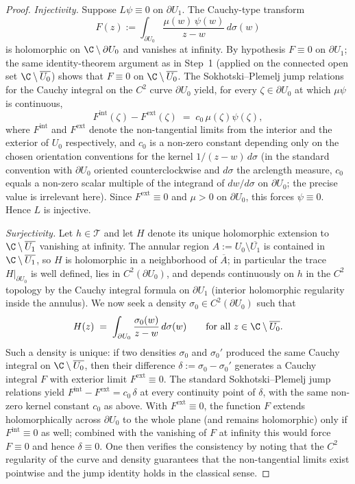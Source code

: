 \begin{proof}
\smallskip
\emph{Injectivity.} Suppose \(L\psi\equiv 0\) on \(\partial U_1\). The
Cauchy-type transform
\[
F(z):=\int_{\partial U_0}\frac{\mu(w)\,\psi(w)}{z-w}\,d\sigma(w)
\]
is holomorphic on \(\C\setminus \partial U_0\) and vanishes at infinity.
By hypothesis \(F\equiv 0\) on \(\partial U_1\); the same identity-theorem
argument as in Step~1 (applied on the connected open set
\(\C\setminus \overline{U_0}\)) shows that
\(F\equiv 0\) on \(\C\setminus \overline{U_0}\). The Sokhotski--Plemelj
jump relations for the Cauchy integral on the \(C^2\) curve
\(\partial U_0\) \cite[Ch.~III]{Garnett} yield, for every
\(\zeta\in \partial U_0\) at which \(\mu\psi\) is continuous,
\[
F^{\mathrm{int}}(\zeta)-F^{\mathrm{ext}}(\zeta)
\;=\;c_0\,\mu(\zeta)\psi(\zeta),
\]
where \(F^{\mathrm{int}}\) and \(F^{\mathrm{ext}}\) denote the
non-tangential limits from the interior and the exterior of \(U_0\)
respectively, and \(c_0\) is a non-zero constant depending only on the
chosen orientation conventions for the kernel \(1/(z-w)\,d\sigma\)
(in the standard convention with \(\partial U_0\) oriented counterclockwise
and \(d\sigma\) the arclength measure, \(c_0\) equals a non-zero scalar
multiple of the integrand of \(dw/d\sigma\) on \(\partial U_0\); the
precise value is irrelevant here). Since \(F^{\mathrm{ext}}\equiv 0\) and
\(\mu>0\) on \(\partial U_0\), this forces \(\psi\equiv 0\). Hence \(L\)
is injective.

\smallskip
\emph{Surjectivity.} Let \(h\in \mathcal{T}\) and let \(H\) denote its
unique holomorphic extension to \(\C\setminus \overline{U_1}\) vanishing at
infinity. The annular region \(A:=U_0\setminus \overline{U_1}\) is
contained in \(\C\setminus \overline{U_1}\), so \(H\) is holomorphic in a
neighborhood of \(\overline{A}\); in particular the trace
\(H|_{\partial U_0}\) is well defined, lies in \(C^2(\partial U_0)\), and
depends continuously on \(h\) in the \(C^2\) topology by the Cauchy integral
formula on \(\partial U_1\) (interior holomorphic regularity inside the
annulus). We now seek a density \(\sigma_0\in C^2(\partial U_0)\) such that
\[
H(z)\;=\;\int_{\partial U_0}\frac{\sigma_0(w)}{z-w}\,d\sigma(w)
\qquad \text{for all }z\in \C\setminus \overline{U_0}.
\]
Such a density is unique: if two densities \(\sigma_0\) and
\(\sigma_0'\) produced the same Cauchy integral on
\(\C\setminus \overline{U_0}\), then their difference \(\delta:=\sigma_0
-\sigma_0'\) generates a Cauchy integral \(F\) with exterior limit
\(F^{\mathrm{ext}}\equiv 0\). The standard Sokhotski--Plemelj jump
relations \cite[Ch.~III]{Garnett} yield
\(F^{\mathrm{int}}-F^{\mathrm{ext}}=c_0\,\delta\) at every continuity
point of \(\delta\), with the same non-zero kernel constant \(c_0\) as
above. With \(F^{\mathrm{ext}}\equiv 0\), the function \(F\) extends
holomorphically across \(\partial U_0\) to the whole plane (and remains
holomorphic) only if \(F^{\mathrm{int}}\equiv 0\) as well; combined with
the vanishing of \(F\) at infinity this would force \(F\equiv 0\) and
hence \(\delta\equiv 0\). One then verifies the consistency by noting
that the \(C^2\) regularity of the curve and density guarantees that the
non-tangential limits exist pointwise and the jump identity holds in the
classical sense.


\end{proof}
